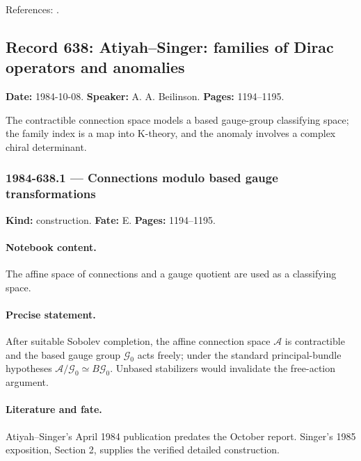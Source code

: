 \noindent References: \citep{grothendieck1984esquisse}.\par

\subsection{Record 638: Atiyah--Singer: families of Dirac operators and anomalies}

\label{talk:638}

\noindent\textbf{Date:} 1984-10-08. \textbf{Speaker:} A. A. Beilinson. \textbf{Pages:} 1194--1195.\par

The contractible connection space models a based gauge-group classifying space; the family index is a map into K-theory, and the anomaly involves a complex chiral determinant.

\subsubsection{1984-638.1 --- Connections modulo based gauge transformations}

\label{item:1984-638.1}

\noindent\textbf{Kind:} construction. \textbf{Fate:} E. \textbf{Pages:} 1194--1195.\par

\paragraph{Notebook content.} The affine space of connections and a gauge quotient are used as a classifying space.

\paragraph{Precise statement.} After suitable Sobolev completion, the affine connection space \(\mathcal A\) is contractible and the based gauge group \(\mathcal G_0\) acts freely; under the standard principal-bundle hypotheses \(\mathcal A/\mathcal G_0\simeq B\mathcal G_0\). Unbased stabilizers would invalidate the free-action argument.

\paragraph{Literature and fate.} Atiyah--Singer's April 1984 publication predates the October report. Singer's 1985 exposition, Section 2, supplies the verified detailed construction.

